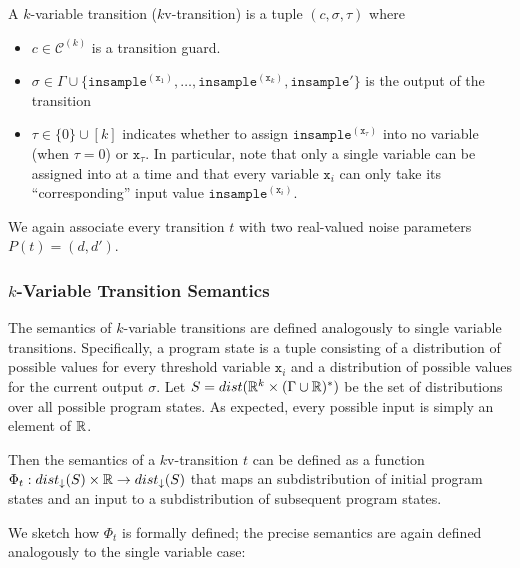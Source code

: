 \begin{defn}
    A $k$-variable transition ($k$v-transition) is a tuple $(c, \sigma, \tau)$ where \begin{itemize}
        \item $c\in\mathcal{C}^{(k)}$ is a transition guard.
        \item $\sigma\in\Gamma\cup\{\texttt{insample}^{(\texttt{x}_1)}, \ldots, \texttt{insample}^{(\texttt{x}_k)}, \texttt{insample}'\}$ is the output of the transition
        \item $\tau \in \{0\} \cup [k]$ indicates whether to assign $\texttt{insample}^{(\texttt{x}_\tau)}$ into no variable (when $\tau = 0$) or $\texttt{x}_\tau$. In particular, note that only a single variable can be assigned into at a time and that every variable $\texttt{x}_i$ can only take its ``corresponding'' input value $\texttt{insample}^{(\texttt{x}_i)}$. 
    \end{itemize}
\end{defn}

We again associate every transition $t$ with two real-valued noise parameters $P(t) = (d, d')$.

\subsubsection{$k$-Variable Transition Semantics}

The semantics of $k$-variable transitions are defined analogously to single variable transitions. Specifically, a program state is a tuple consisting of a distribution of possible values for every threshold variable $\texttt{x}_i$ and a distribution of possible values for the current output $\sigma$. Let $S = dist(\mathbb{R}^k\times (\Gamma\cup \mathbb{R})^*)$ be the set of distributions over all possible program states. As expected, every possible input is simply an element of $\mathbb{R}$. 



Then the semantics of a $k$v-transition $t$ can be defined as a function $\Phi_t: dist_\downarrow(S)\times \mathbb{R}\to dist_\downarrow(S)$ that maps an subdistribution of initial program states and an input to a subdistribution of subsequent program states.

We sketch how $\Phi_t$ is formally defined; the precise semantics are again defined analogously to the single variable case:

